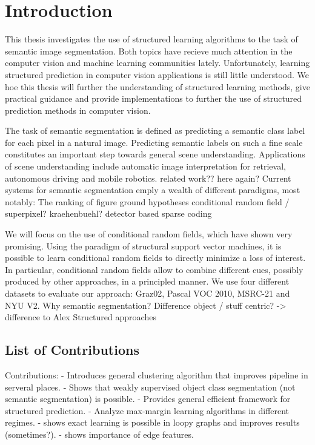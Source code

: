 
\chapter{Introduction}
This thesis investigates the use of structured learning algorithms to the task
of semantic image segmentation. Both topics have recieve much attention in the
computer vision and machine learning communities lately. Unfortunately,
learning structured prediction in computer vision applications is still little
understood.  We hoe this thesis will further the understanding of structured
learning methods, give practical guidance and provide implementations to
further the use of structured prediction methods in computer vision.

The task of semantic segmentation is defined as predicting a semantic class label
for each pixel in a natural image. Predicting semantic labels on such a fine scale
constitutes an important step towards general scene understanding.
%
Applications of scene understanding include automatic image interpretation for retrieval,
 autonomous driving and mobile robotics.
%
related work?? here again?
Current systems for semantic segmentation emply a wealth of different paradigms, most notably:
The ranking of figure ground hypotheses
conditional random field / superpixel? kraehenbuehl?
detector based
sparse coding

We will focus on the use of conditional random fields, which have shown very
promising.  Using the paradigm of structural support vector machines, it is
possible to learn conditional random fields to directly minimize a loss of
interest. In particular, conditional random fields allow to combine different
cues, possibly produced by other approaches, in a principled manner.
%
We use four different datasets to evaluate our approach: Graz02, Pascal VOC
2010, MSRC-21 and NYU V2.
%
Why semantic segmentation? Difference object / stuff centric? -> difference to Alex
Structured approaches
%

\section{List of Contributions}
Contributions:
- Introduces general clustering algorithm that improves pipeline in serveral places.
- Shows that weakly supervised object class segmentation (not semantic segmentation) is possible.
- Provides general efficient framework for structured prediction.
- Analyze max-margin learning algorithms in different regimes.
- shows exact learning is possible in loopy graphs and improves results (sometimes?).
- shows importance of edge features.

